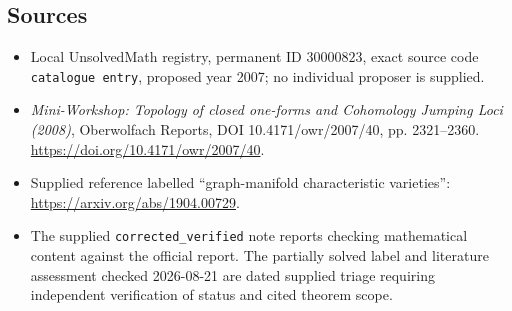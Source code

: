 \documentclass[11pt]{article}
\begin{document}
\subsection{Sources}
\begin{itemize}
\item Local UnsolvedMath registry, permanent ID \(30000823\), exact source code \texttt{catalogue entry}, proposed year 2007; no individual proposer is supplied.
\item \emph{Mini-Workshop: Topology of closed one-forms and Cohomology Jumping Loci (2008)}, Oberwolfach Reports, DOI 10.4171/owr/2007/40, pp. 2321--2360. \url{https://doi.org/10.4171/owr/2007/40}.
\item Supplied reference labelled ``graph-manifold characteristic varieties'': \url{https://arxiv.org/abs/1904.00729}.
\item The supplied \texttt{corrected\_verified} note reports checking mathematical content against the official report. The partially solved label and literature assessment checked 2026-08-21 are dated supplied triage requiring independent verification of status and cited theorem scope.
\end{itemize}
\end{document}
